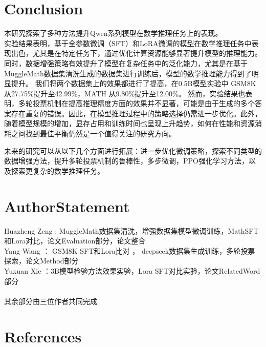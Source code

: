 \documentclass{article}
\begin{document}
  






\section{Conclusion}

本研究探索了多种方法提升Qwen系列模型在数学推理任务上的表现。\\
实验结果表明，基于全参数微调（SFT）和LoRA微调的模型在数学推理任务中表现出色，尤其是在特定任务下，通过优化计算资源能够显著提升模型的推理能力。同时，数据增强策略有效提升了模型在复杂任务中的泛化能力，尤其是在基于MuggleMath数据集清洗生成的数据集进行训练后，模型的数学推理能力得到了明显提升。
我们将两个数据集上的效果都进行了提高，在0.5B模型实验中 GSM8K 从27.75\%提升至42.99\%，MATH 从9.80\%提升至12.00\%。
然而，实验结果也表明，多轮投票机制在提高推理精度方面的效果并不显著，可能是由于生成的多个答案存在重复的错误。因此，在模型推理过程中的策略选择仍需进一步优化。此外，随着模型规模的增加，显存占用和训练时间也呈现上升趋势，如何在性能和资源消耗之间找到最佳平衡仍然是一个值得关注的研究方向。

未来的研究可以从以下几个方面进行拓展：进一步优化微调策略，探索不同类型的数据增强方法，提升多轮投票机制的鲁棒性，多步微调，PPO强化学习方法，以及探索更复杂的数学推理任务。
\section{AuthorStatement}

Huazheng Zeng : MuggleMath数据集清洗，增强数据集模型微调训练，MathSFT和Lora对比，论文Evaluation部分，论文整合\\
Yang Wang ： GSM8K SFT和Lora比对 ， deepseek数据集生成训练，多轮投票探索，论文Method部分\\
Yuxuan Xie ：3B模型检验方法效果实验，Lora SFT对比实验，论文RelatedWord部分\\
\\其余部分由三位作者共同完成




\section{References}

\end{document}
